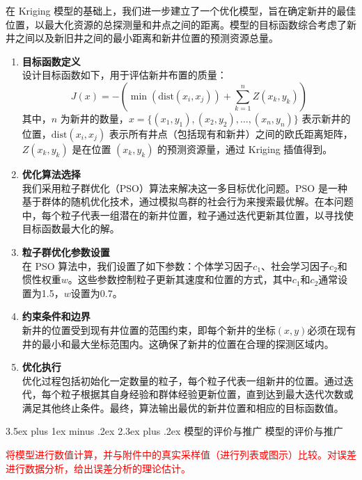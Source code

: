\documentclass[12pt,a4paper]{nmmcm}
\makeatletter
\renewcommand\section{\@startsection{section}{1}{0pt}%
    {3.5ex plus 1ex minus .2ex}%
    {2.3ex plus .2ex}%
    {\normalfont\LARGE\bfseries}}
\makeatother
\begin{document}
在 Kriging 模型的基础上，我们进一步建立了一个优化模型，旨在确定新井的最佳位置，以最大化资源的总探测量和井点之间的距离。模型的目标函数综合考虑了新井之间以及新旧井之间的最小距离和新井位置的预测资源总量。

\begin{enumerate}
  \item \textbf{目标函数定义} \\
        设计目标函数如下，用于评估新井布置的质量：
        \[
        J(x) = -\left(\min(\text{dist}(x_i, x_j)) + \sum_{k=1}^{n} Z(x_k, y_k)\right)
        \]
        其中，$n$ 为新井的数量，$x = \{(x_1, y_1), (x_2, y_2), \ldots, (x_{n}, y_{n})\}$ 表示新井的位置，$\text{dist}(x_i, x_j)$ 表示所有井点（包括现有和新井）之间的欧氏距离矩阵，$Z(x_k, y_k)$ 是在位置 $(x_k, y_k)$ 的预测资源量，通过 Kriging 插值得到。

  \item \textbf{优化算法选择} \\
        我们采用粒子群优化（PSO）算法来解决这一多目标优化问题。PSO 是一种基于群体的随机优化技术，通过模拟鸟群的社会行为来搜索最优解。在本问题中，每个粒子代表一组潜在的新井位置，粒子通过迭代更新其位置，以寻找使目标函数最大化的解。

  \item \textbf{粒子群优化参数设置} \\
        在 PSO 算法中，我们设置了如下参数：个体学习因子$c_1$、社会学习因子$c_2$和惯性权重$w$。这些参数控制粒子更新其速度和位置的方式，其中$c_1$和$c_2$通常设置为1.5，$w$设置为0.7。

  \item \textbf{约束条件和边界} \\
        新井的位置受到现有井位置的范围约束，即每个新井的坐标$(x, y)$必须在现有井的最小和最大坐标范围内。这确保了新井的位置在合理的探测区域内。

  \item \textbf{优化执行} \\
        优化过程包括初始化一定数量的粒子，每个粒子代表一组新井的位置。通过迭代，每个粒子根据其自身经验和群体经验更新位置，直到达到最大迭代次数或满足其他终止条件。最终，算法输出最优的新井位置和相应的目标函数值。
\end{enumerate}


\section{模型的评价与推广 模型的评价与推广}

\textcolor{red}{将模型进行数值计算，并与附件中的真实采样值（进行列表或图示）比较。对误差进行数据分析，给出误差分析的理论估计。}
\end{document}
